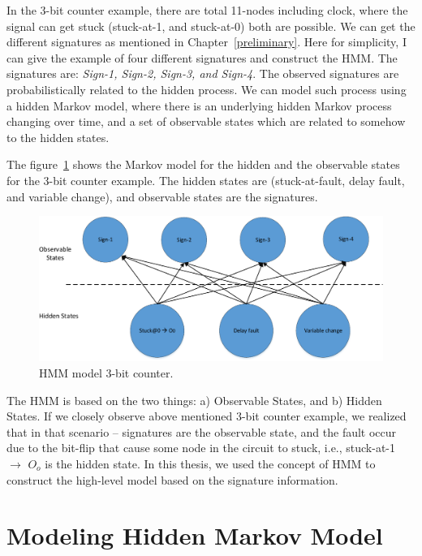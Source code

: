 In the 3-bit counter example, there are total 11-nodes including clock, where the signal can get stuck (stuck-at-1, and stuck-at-0) both are possible. We can get the  different signatures as mentioned in Chapter~\ref{preliminary}. Here for simplicity, I can give the example of four different signatures and construct the HMM. The signatures are: \textit{Sign-1, Sign-2, Sign-3, and Sign-4}. The observed signatures are probabilistically related to the hidden process. We can model such process using a hidden Markov model, where there is an underlying hidden Markov process changing over time, and a set of observable states which are related to somehow to the hidden states.


The figure~\ref{fig:HMM-3-bit} shows the Markov model for the hidden and the observable states for the 3-bit counter example. The hidden states are (stuck-at-fault, delay fault, and variable change), and observable states are  the signatures. 


\begin{figure}[tb!]

 \centering
  \captionsetup{justification=centering}    
   \includegraphics[scale=0.8]{Figures/HMM.pdf}
   \caption{HMM model 3-bit counter.}
\label{fig:HMM-3-bit}
\end{figure}




The HMM is based on  the two things: a) Observable States, and b) Hidden States. If we closely observe above mentioned 3-bit counter example, we realized that in that scenario --  signatures are the observable state, and the fault occur due to the bit-flip that cause some node in the circuit to stuck, i.e., stuck-at-1 $\rightarrow$ $O_o$ is the hidden state. In this thesis, we used the concept of HMM to construct the high-level model based on the signature information.





\section{Modeling Hidden Markov Model}


